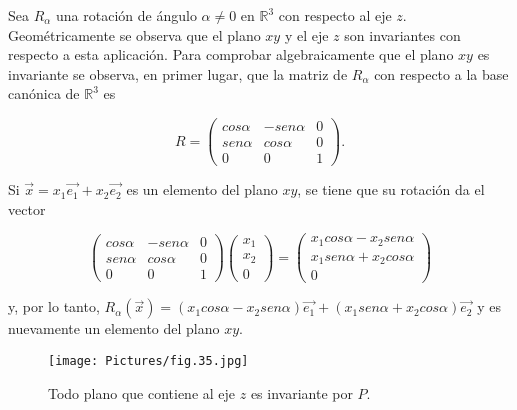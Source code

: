 \begin{example}

Sea $R_\alpha$ una rotación de ángulo $\alpha\neq 0$ en $\mathbb{R}^3$ con respecto al eje $z$. Geométricamente se observa que el plano $xy$ y el eje $z$ son invariantes con respecto a esta aplicación. Para comprobar algebraicamente que el plano $xy$ es invariante se observa, en primer lugar,  que la matriz de $R_\alpha$ con respecto a la base canónica de $\mathbb{R}^3$ es 


$$R=\left(\begin{array}{ccc} cos\alpha & -sen\alpha &  0 \\ sen\alpha & cos\alpha & 0
\\ 0 & 0 & 1
\end{array}
 \right).$$

\vskip0.25cm
Si $\vec{x}=x_1\vec{e_1}+ x_2\vec{e_2}$ es un elemento del plano $xy$, se tiene que su rotación da el vector



$$\left(\begin{array}{ccc} cos\alpha & -sen\alpha &  0 \\ sen\alpha & cos\alpha & 0
\\ 0 & 0 & 1
\end{array}
 \right)  \left(\begin{array}{c} x_1 \\ x_2
\\ 0 
\end{array}
 \right) =  \left(\begin{array}{c} x_1cos\alpha- x_2sen\alpha  \\ x_1sen\alpha+ x_2cos\alpha 
\\ 0 
\end{array}
 \right)   $$

 \bigskip
\noindent 
y, por lo tanto, $R_\alpha(\vec{x})= (x_1cos\alpha- x_2sen\alpha)\vec{e_1}+  (x_1sen\alpha+ x_2cos\alpha) \vec{e_2}     $  y  es nuevamente un elemento del plano $xy$.

\end{example}
\begin{figure}[ht]
    \centering
    \texttt{[image: Pictures/fig.35.jpg]}
    \caption{Todo plano que contiene al eje $z$ es invariante por $P$.
    }
    \label{pag286}
\end{figure}

\bigskip

